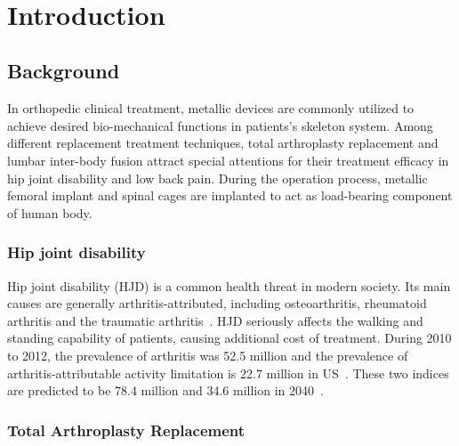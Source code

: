 \documentclass[12pt]{extbook}
\begin{document}
\tableofcontents

\newpage

\listoffigures

\newpage

\listoftables

\newpage
\thispagestyle{empty}
~\\

\newpage
\setcounter{page}{1}

\chapter{Introduction}
\label{intro}

\section{Background}
\label{intro_back}

In orthopedic clinical treatment, metallic devices are commonly utilized to achieve desired bio-mechanical functions in patients's skeleton system. Among different replacement treatment techniques, total arthroplasty replacement and lumbar inter-body fusion attract special attentions for their treatment efficacy in hip joint disability and low back pain. During the operation process, metallic femoral implant and spinal cages are implanted to act as load-bearing component of human body.\\

\subsection{Hip joint disability}

Hip joint disability (HJD) is a common health threat in modern society. Its main causes are generally arthritis-attributed, including osteoarthritis, rheumatoid arthritis and the traumatic arthritis~\cite{foran2015total}. HJD seriously affects the walking and standing capability of patients, causing additional cost of treatment. During 2010 to 2012, the prevalence of arthritis was 52.5 million and the prevalence of arthritis-attributable activity limitation is 22.7 million in US~\cite{barbour2013prevalence}. These two indices are predicted to be 78.4 million and 34.6 million in 2040~\cite{hootman2016updated}.\\

\subsection{Total Arthroplasty Replacement}
\end{document}
